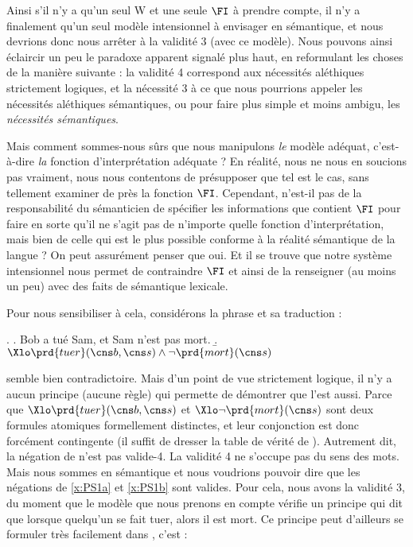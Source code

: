 Ainsi s'il n'y a qu'un seul \Unv W et une seule $\FI$ à prendre compte, il n'y a finalement qu'un seul modèle intensionnel à envisager en sémantique, et nous devrions donc nous arrêter à la validité 3 (avec ce modèle).
Nous pouvons ainsi éclaircir un peu le paradoxe apparent signalé plus haut, en reformulant les choses de la manière suivante : la validité 4 correspond aux nécessités aléthiques strictement logiques, et la nécessité 3 à ce que nous pourrions appeler les nécessités aléthiques sémantiques, ou pour faire plus simple et moins ambigu, les \emph{nécessités sémantiques}. 

Mais comment sommes-nous sûrs que nous manipulons \emph{le} modèle adéquat, c'est-à-dire \emph{la} fonction d'interprétation adéquate ? 
En réalité, nous ne nous en soucions pas vraiment, nous nous contentons de présupposer que tel est le cas, sans tellement examiner de près la fonction $\FI$.
Cependant, n'est-il pas de la responsabilité du sémanticien de spécifier les informations que contient $\FI$ pour faire en sorte qu'il ne s'agit pas de n'importe quelle fonction d'interprétation, mais bien de celle qui est le plus possible conforme à la réalité sémantique de la langue ? On peut assurément penser que oui. Et il se trouve que notre système intensionnel nous permet de contraindre $\FI$ et ainsi de la renseigner (au moins un peu) avec des faits de sémantique lexicale. %

Pour nous sensibiliser à cela, considérons la phrase \Next[a] et sa traduction \Next[b] : 

\ex.
\a. Bob a tué Sam, et Sam n'est pas mort. \label{x:PS1a}
\b. \(\Xlo\prd{tuer}(\cns b,\cns s) \wedge \neg\prd{mort}(\cns s)\) \label{x:PS1b}


\Last[a] semble bien contradictoire. Mais d'un point de vue strictement logique, il n'y a aucun principe (aucune règle) qui permette de démontrer que \Last[b] l'est aussi. 
Parce que \(\Xlo\prd{tuer}(\cns b,\cns s)\) et  \(\Xlo\neg\prd{mort}(\cns s)\) sont deux formules atomiques formellement distinctes, et leur conjonction est donc forcément contingente (il suffit de dresser la table de vérité de \Last[b]). 
Autrement dit, la négation de \Last[b] n'est pas valide-4. 
La validité 4 ne s'occupe pas du sens des mots.  Mais nous sommes en sémantique et nous voudrions pouvoir dire que les négations de \ref{x:PS1a} et \ref{x:PS1b} sont valides.  Pour cela, nous avons la validité 3, du moment que le modèle que nous prenons en compte vérifie un principe qui dit que lorsque quelqu'un se fait tuer, alors il est mort.  Ce principe peut d'ailleurs se formuler très facilement dans {\LO}, c'est :


